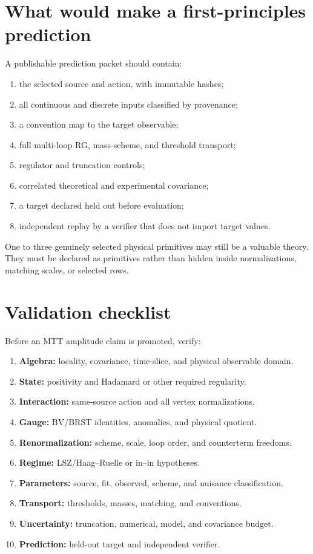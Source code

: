 \documentclass[11pt,a4paper]{article}
\numberwithin{equation}{section}
\theoremstyle{definition}
\theoremstyle{remark}
\begin{document}
\section{What would make a first-principles prediction}

A publishable prediction packet should contain:
\begin{enumerate}
\item the selected source and action, with immutable hashes;
\item all continuous and discrete inputs classified by provenance;
\item a convention map to the target observable;
\item full multi-loop RG, mass-scheme, and threshold transport;
\item regulator and truncation controls;
\item correlated theoretical and experimental covariance;
\item a target declared held out before evaluation;
\item independent replay by a verifier that does not import target values.
\end{enumerate}
One to three genuinely selected physical primitives may still be a valuable
theory.  They must be declared as primitives rather than hidden inside
normalizations, matching scales, or selected rows.

\section{Validation checklist}

Before an MTT amplitude claim is promoted, verify:
\begin{enumerate}
\item \textbf{Algebra:} locality, covariance, time-slice, and physical
observable domain.
\item \textbf{State:} positivity and Hadamard or other required regularity.
\item \textbf{Interaction:} same-source action and all vertex
normalizations.
\item \textbf{Gauge:} BV/BRST identities, anomalies, and physical quotient.
\item \textbf{Renormalization:} scheme, scale, loop order, and counterterm
freedoms.
\item \textbf{Regime:} LSZ/Haag--Ruelle or in--in hypotheses.
\item \textbf{Parameters:} source, fit, observed, scheme, and nuisance
classification.
\item \textbf{Transport:} thresholds, masses, matching, and conventions.
\item \textbf{Uncertainty:} truncation, numerical, model, and covariance
budget.
\item \textbf{Prediction:} held-out target and independent verifier.
\end{enumerate}
\end{document}
